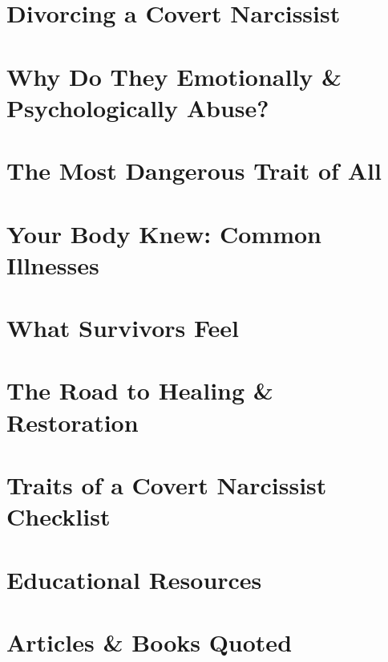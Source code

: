 \documentclass{article}
\numberwithin{equation}{section}
\begin{document}
\section{Divorcing a Covert Narcissist}


\section{Why Do They Emotionally \& Psychologically Abuse?}


\section{The Most Dangerous Trait of All}


\section{Your Body Knew: Common Illnesses}


\section{What Survivors Feel}


\section{The Road to Healing \& Restoration}


\section{Traits of a Covert Narcissist Checklist}


\section{Educational Resources}


\section{Articles \& Books Quoted}


\printbibliography[heading=bibintoc]
	
\end{document}
